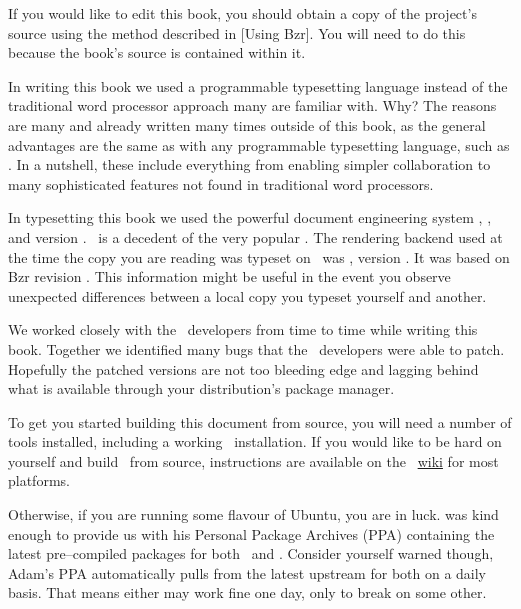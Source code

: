 

If you would like to edit this book, you should obtain a copy of the project's source using the method described in [Using Bzr]. You will need to do this because the book's source is contained within it.

In writing this book we used a programmable typesetting language instead of the traditional word processor approach many are familiar with. Why? The reasons are many and already written many times outside of this book, as the general advantages are the same as with any programmable typesetting language, such as \LATEX. In a nutshell, these include everything from enabling simpler collaboration to many sophisticated features not found in traditional word processors.\footnotecite[taraborelli2011]

In typesetting this book we used the powerful document engineering system \CONTEXT, \contextmark, and version \contextversion. \CONTEXT\ is a decedent of the very popular \LATEX. The rendering backend used at the time the copy you are reading was typeset on \currentdate\ was \texjitenginename, version \texengineversion. It was based on Bzr revision \BzrRevisionClickable. This information might be useful in the event you observe unexpected differences between a local copy you typeset yourself and another. 

We worked closely with the \CONTEXT\ developers from time to time while writing this book. Together we identified many bugs that the \CONTEXT\ developers were able to patch. Hopefully the patched versions are not too bleeding edge and lagging behind what is available through your distribution's package manager.

To get you started building this document from source, you will need a number of tools installed, including a working \CONTEXT\ installation. If you would like to be hard on yourself and build \CONTEXT\ from source, instructions are available on the \CONTEXT\ \href{http://wiki.contextgarden.net/ConTeXt_Minimals}{wiki} for most platforms. 

Otherwise, if you are running some flavour of Ubuntu, you are in luck.  was kind enough to provide us with his Personal Package Archives (PPA) containing the latest pre--compiled packages for both \CONTEXT\ and \texenginename. Consider yourself warned though, Adam's PPA automatically pulls from the latest upstream for both on a daily basis. That means either may work fine one day, only to break on some other.

